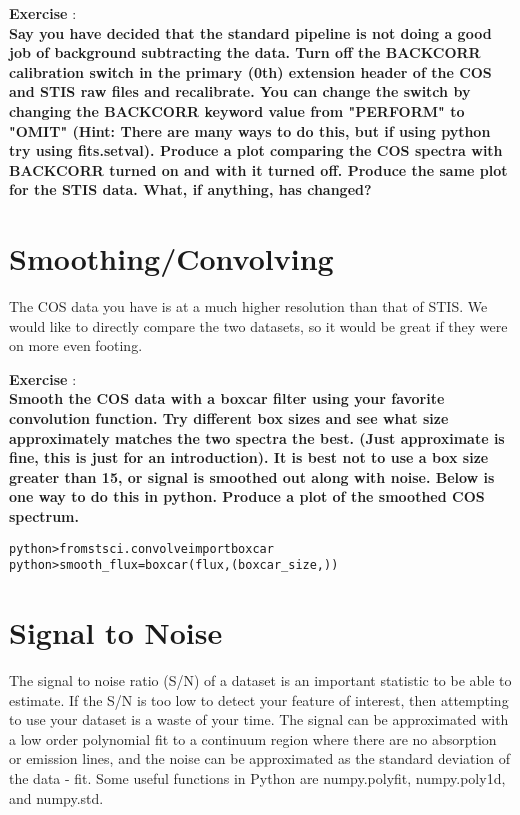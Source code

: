 {\bf \color{blue} Exercise  }:  \\
{ \bf Say you have decided that the standard pipeline is not doing a good job of background subtracting the data.  Turn off the BACKCORR calibration switch in the primary (0th) extension header of the COS and STIS raw files and recalibrate.  You can change the switch by changing the BACKCORR keyword value from "PERFORM" to "OMIT" (Hint: There are many ways to do this, but if using python try using fits.setval). Produce a plot comparing the COS spectra with BACKCORR turned on and with it turned off. Produce the same plot for the STIS data. What, if anything, has changed?} 
\section{Smoothing/Convolving}
The COS data you have is at a much higher resolution than that of STIS.  We would like to directly compare the two datasets, so it would be great if they were on more even footing.  

{\bf \color{blue} Exercise  }:  \\
{\bf Smooth the COS data with a boxcar filter using your favorite convolution function.  Try different box sizes and see what size approximately matches the two spectra the best.  (Just approximate is fine, this is just for an introduction). It is best not to use a box size greater than 15, or signal is smoothed out along with noise. Below is one way to do this in python. Produce a plot of the smoothed COS spectrum.}
\begin{alltt}
python> from stsci.convolve import boxcar
python> smooth_flux = boxcar(flux, (boxcar_size,) )
\end{alltt}



\section{Signal to Noise}
The signal to noise ratio (S/N) of a dataset is an important statistic to be able to estimate.  If the S/N is too low to detect your feature of interest, then attempting to use your dataset is a waste of your time. The signal can be approximated with a low order polynomial fit to a continuum region where there are no absorption or emission lines, and the noise can be approximated as the standard deviation of the data - fit.  Some useful functions in Python are numpy.polyfit, numpy.poly1d, and numpy.std. 


